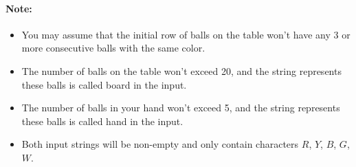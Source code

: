 \paragraph{Note:}
\begin{itemize}
\item You may assume that the initial row of balls on the table won’t have any 3 or more consecutive balls with the same color.
\item The number of balls on the table won't exceed 20, and the string represents these balls is called board in the input.
\item The number of balls in your hand won't exceed 5, and the string represents these balls is called hand in the input.
\item Both input strings will be non-empty and only contain characters $ R $, $ Y $, $ B $, $ G $, $ W $.
\end{itemize}